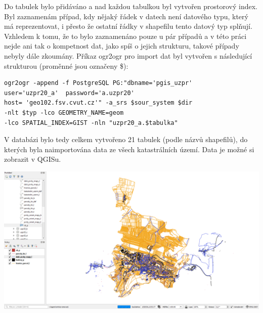 \documentclass[12pt]{article}
\begin{document}
Do tabulek bylo přidáváno a nad každou tabulkou byl vytvořen prostorový index. Byl zaznamenám případ, kdy nějaký řádek v datech není datového typu, který má reprezentovat, i přesto že ostatní řádky v shapefilu tento datový typ splňují. Vzhledem k tomu, že to bylo zaznamenáno pouze u pár případů a v této práci nejde ani tak o kompetnost dat, jako spíš o jejich strukturu, takové případy nebyly dále zkoumány. Příkaz ogr2ogr pro import dat byl vytvořen s následující strukturou (proměnné jsou označeny \$):

\begin{lstlisting}
ogr2ogr -append -f PostgreSQL PG:"dbname='pgis_uzpr' 
user='uzpr20_a'  password='a.uzpr20' 
host= 'geo102.fsv.cvut.cz'" -a_srs $sour_system $dir 
-nlt $typ -lco GEOMETRY_NAME=geom 
-lco SPATIAL_INDEX=GIST -nln "uzpr20_a.$tabulka"
\end{lstlisting}

V databázi bylo tedy celkem vytvořeno 21 tabulek (podle názvů shapefilů), do kterých byla naimportována data ze všech katastrálních území. Data je možné si zobrazit v QGISu.

\begin{center}
	\includegraphics[width=15cm]{./img/qgis_data.png}
\end{center}
\end{document}
